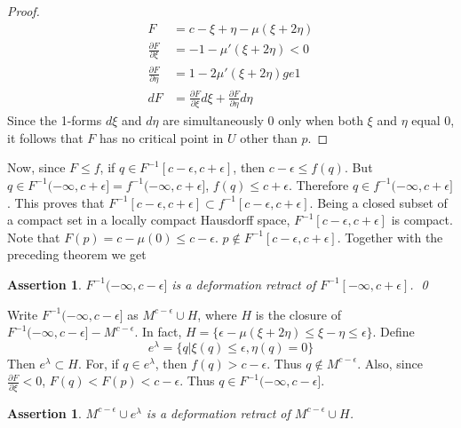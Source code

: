 \documentclass[a4paper,11pt,reqno]{amsart}
\newtheorem{asser}[thm]{Assertion}
\begin{document}
\begin{proof}
  \begin{equation}
    \nonumber
    \begin{aligned}
      F &= c - \xi + \eta - \mu(\xi+2\eta) \\
      \frac{\partial F}{\partial \xi} &= -1 - \mu'(\xi+2\eta) < 0 \\
      \frac{\partial F}{\partial \eta} &= 1 - 2\mu'(\xi+2\eta) ge 1 \\
      dF &= \frac{\partial F}{\partial \xi}d\xi+\frac{\partial F}{\partial
        \eta}d\eta
    \end{aligned}
  \end{equation}
  Since the 1-forms $d\xi$ and $d\eta$ are simultaneously 0 only when both
  $\xi$ and $\eta$ equal 0, it follows that $F$ has no critical point in $U$
  other than $p$.
\end{proof}

Now, since $F \le f$, if $q \in F^{-1}[c-\epsilon, c+\epsilon]$, then
$c-\epsilon \le f(q)$. But $q \in F^{-1}(-\infty, c+\epsilon] = f^{-1}(-\infty,
c+\epsilon]$, $f(q) \le c+ \epsilon$. Therefore $q \in f^{-1}(-\infty,
c+\epsilon]$. This proves that $F^{-1}[c-\epsilon, c+\epsilon] \subset
f^{-1}[c-\epsilon, c+\epsilon]$. Being a closed subset of a compact set in a
locally compact Hausdorff space, $F^{-1}[c-\epsilon, c+\epsilon]$ is compact.
Note that $F(p) = c- \mu(0) \le c-\epsilon$. $p \notin F^{-1}[c-\epsilon,
c+\epsilon]$. Together with the preceding theorem we get

\begin{asser}
  $F^{-1}(-\infty, c-\epsilon]$ is a deformation retract of $F^{-1}[-\infty,
  c+\epsilon]$. \qed
\end{asser}

Write $F^{-1}(-\infty, c-\epsilon]$ as $M^{c-\epsilon}\cup H$, where $H$ is the
closure of $F^{-1}(-\infty, c-\epsilon] - M^{c-\epsilon}$. In fact, $H = \{
\epsilon-\mu(\xi+2\eta) \le \xi-\eta \le \epsilon \}$. Define
\begin{equation}
  e^\lambda = \{ q | \xi(q) \le \epsilon, \eta(q) = 0\}
\end{equation}
Then $e^\lambda \subset H$. For, if $q \in e^\lambda$, then $f(q) >
c-\epsilon$. Thus $q \notin M^{c-\epsilon}$. Also, since $\frac{\partial
  F}{\partial \xi} < 0$, $F(q) < F(p) < c-\epsilon$. Thus $q \in F^{-1}(-\infty,
c-\epsilon]$.

\begin{asser}
  $M^{c-\epsilon} \cup e^\lambda$ is a deformation retract of
  $M^{c-\epsilon}\cup H$.
\end{asser}
\end{document}
